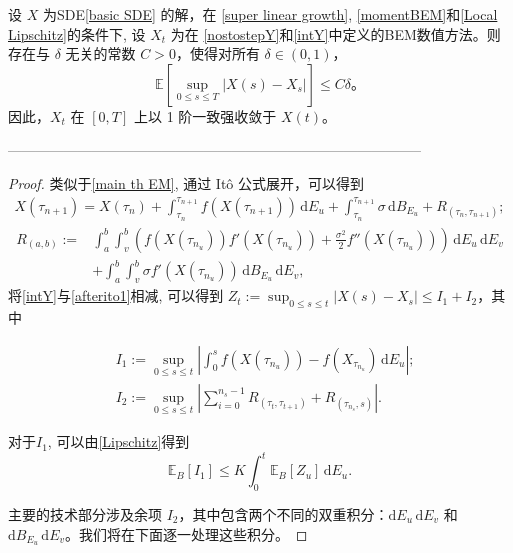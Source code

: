 \begin{theorem}\label{main th BEM1}
	设 $X$ 为SDE\textnormal{\cref{basic SDE} }的解，在 \textnormal{\cref{super linear growth}}, \textnormal{\cref{momentBEM}}和\textnormal{\cref{Local Lipschitz}}的条件下, 
	设 $X_t$ 为在 \textnormal{\cref{nostostepY}}和\textnormal{\cref{intY}}中定义的BEM数值方法。则存在与 $\delta$ 无关的常数 $C > 0$，使得对所有 $\delta \in (0,1)$，
	\[
	\mathbb{E} \left[ \sup_{0 \leq s \leq T} | X(s) - X_s | \right] \leq C \delta。
	\]
	因此，$X_t$ 在 $[0, T]$ 上以 1 阶一致强收敛于 $X(t)$。
\end{theorem}

-----------------------------------------------------------------------------------------


\begin{proof}
	类似于\cref{main th EM}, 通过 Itô 公式展开，可以得到
	\begin{align}\label{afterito1}
		X(\tau_{n+1}) = X(\tau_n) +  \int_{\tau_n}^{\tau_{n+1}} f(X(\tau_{n+1})) \, \mathrm{d}E_u + \int_{\tau_n}^{\tau_{n+1}} \sigma \, \mathrm{d}B_{E_u} + R_{(\tau_n, \tau_{n+1})}; 
	\end{align}
	\begin{align*}
		R_{(a,b)} :=&  \int_a^b \int_v^{b} \left( f(X(\tau_{n_{u}}))f'(X(\tau_{n_{u}})) + \frac{\sigma ^2}{2} f''(X(\tau_{n_{u}}))  \right) \, \mathrm{d}E_{u} \, \mathrm{d}E_{v} \\
		&+ \int_a^b \int_v^{b} \sigma f'(X(\tau_{n_{u}}))   \, \mathrm{d}B_{E_{u}} \,\nonumber \mathrm{d}E_{v},
	\end{align*}
	将\cref{intY}与\cref{afterito1}相减, 可以得到
	$Z_t := \sup_{0 \leq s \leq t} | X(s) - X_s | \leq I_1 + I_2 $，其中
	
	$$
	\begin{aligned}
		&I_1 := \sup_{0 \leq s \leq t} \left| \int_0^s f(X(\tau_{n_u})) - f(X_{\tau_{n_u}})  \, \mathrm{d}E_u \right|; \\
		&I_2 := \sup_{0 \leq s \leq t} \left| \sum_{i=0}^{n_s - 1} R_{(\tau_{t}, \tau_{t+1})} + R_{(\tau_{n_s}, s)} \right|.
	\end{aligned}
	$$
	
	对于$I_1$, 可以由\cref{Lipschitz}得到
	\begin{equation}\label{II1}
		\mathbb{E}_B[I_1] \leq K \int_0^t \mathbb{E}_B[Z_u] \, \mathrm{d}E_u.
	\end{equation}
	
	主要的技术部分涉及余项 $I_2$，其中包含两个不同的双重积分：$\mathrm{d}E_{u} \, \mathrm{d}E_{v}$ 和 $\mathrm{d}B_{E_{u}} \, \mathrm{d}E_{v}$。我们将在下面逐一处理这些积分。
	

\end{proof}
